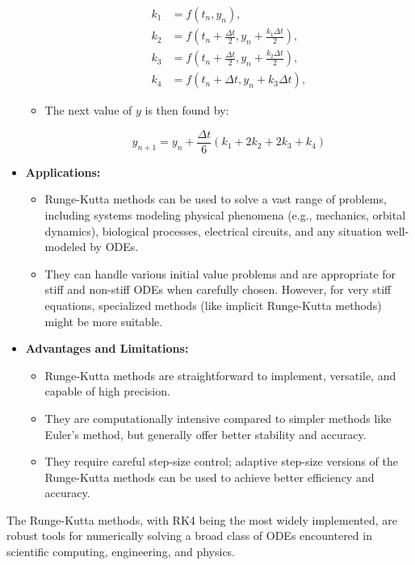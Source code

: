 \begin{airesult}
\begin{itemize}
\begin{itemize}
  \[
  \begin{aligned}
  k_1 &= f(t_n, y_n), \\
  k_2 &= f\left(t_n + \frac{\Delta t}{2}, y_n + \frac{k_1 \Delta t}{2}\right), \\
  k_3 &= f\left(t_n + \frac{\Delta t}{2}, y_n + \frac{k_2 \Delta t}{2}\right), \\
  k_4 &= f(t_n + \Delta t, y_n + k_3 \Delta t),
  \end{aligned}
  \]

  \item The next value of \( y \) is then found by:

  \[
  y_{n+1} = y_n + \frac{\Delta t}{6} (k_1 + 2k_2 + 2k_3 + k_4)
  \]

  \end{itemize}

\item \textbf{Applications:}

  \begin{itemize}
  \item Runge-Kutta methods can be used to solve a vast range of problems, including systems
modeling physical phenomena (e.g., mechanics, orbital dynamics), biological processes, electrical
circuits, and any situation well-modeled by ODEs.
  \item They can handle various initial value problems and are appropriate for stiff and non-stiff
ODEs when carefully chosen. However, for very stiff equations, specialized methods (like implicit
Runge-Kutta methods) might be more suitable.
  \end{itemize}

\item \textbf{Advantages and Limitations:}

  \begin{itemize}
  \item Runge-Kutta methods are straightforward to implement, versatile, and capable of high
precision.
  \item They are computationally intensive compared to simpler methods like Euler's method, but
generally offer better stability and accuracy.
  \item They require careful step-size control; adaptive step-size versions of the Runge-Kutta
methods can be used to achieve better efficiency and accuracy.
  \end{itemize}

\end{itemize}

\vsp

The Runge-Kutta methods, with RK4 being the most widely implemented, are robust tools for
numerically solving a broad class of ODEs encountered in scientific computing, engineering, and
physics.
\end{airesult}


